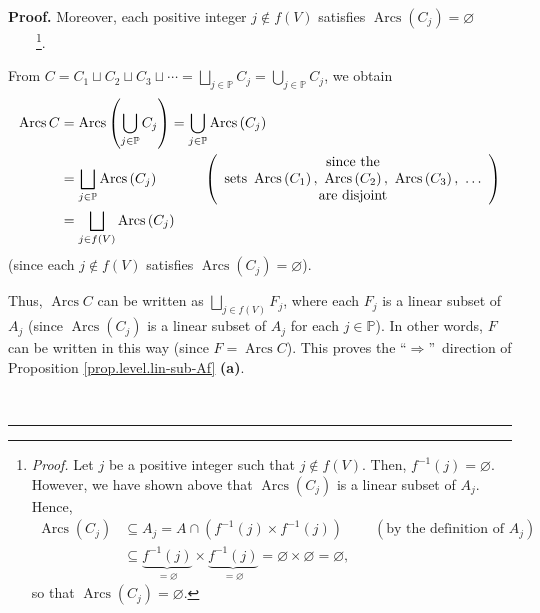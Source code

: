 \documentclass[numbers=enddot,12pt,final,onecolumn,notitlepage]{scrartcl}%
\numberwithin{exer}{section}
\theoremstyle{definition}
\newenvironment{proof}[1][Proof]{\noindent\textbf{#1.} }{\ \rule{0.5em}{0.5em}}
\let\cupnonlimits\bigcup
\let\sqcupnonlimits\bigsqcup
\renewcommand{\bigcup}{\cupnonlimits\limits}
\renewcommand{\bigsqcup}{\sqcupnonlimits\limits}
\newenvironment{verlong}{}{}
\begin{document}
\begin{verlong}
\begin{proof}
Moreover, each positive integer $j\notin f\left(  V\right)  $ satisfies
$\operatorname*{Arcs}\left(  C_{j}\right)  =\varnothing$%
\ \ \ \ \footnote{\textit{Proof.} Let $j$ be a positive integer such that
$j\notin f\left(  V\right)  $. Then, $f^{-1}\left(  j\right)  =\varnothing$.
However, we have shown above that $\operatorname*{Arcs}\left(  C_{j}\right)  $
is a linear subset of $A_{j}$. Hence,%
\begin{align*}
\operatorname*{Arcs}\left(  C_{j}\right)   &  \subseteq A_{j}=A\cap\left(
f^{-1}\left(  j\right)  \times f^{-1}\left(  j\right)  \right)
\ \ \ \ \ \ \ \ \ \ \left(  \text{by the definition of }A_{j}\right) \\
&  \subseteq\underbrace{f^{-1}\left(  j\right)  }_{=\varnothing}%
\times\underbrace{f^{-1}\left(  j\right)  }_{=\varnothing}=\varnothing
\times\varnothing=\varnothing,
\end{align*}
so that $\operatorname*{Arcs}\left(  C_{j}\right)  =\varnothing$.}.

From $C=C_{1}\sqcup C_{2}\sqcup C_{3}\sqcup\cdots=\bigsqcup_{j\in\mathbb{P}%
}C_{j}=\bigcup_{j\in\mathbb{P}}C_{j}$, we obtain%
\begin{align}
\operatorname*{Arcs}C  &  =\operatorname*{Arcs}\left(  \bigcup_{j\in
\mathbb{P}}C_{j}\right)  =\bigcup_{j\in\mathbb{P}}\operatorname*{Arcs}\left(
C_{j}\right) \nonumber\\
&  =\bigsqcup_{j\in\mathbb{P}}\operatorname*{Arcs}\left(  C_{j}\right)
\ \ \ \ \ \ \ \ \ \ \left(
\begin{array}
[c]{c}%
\text{since the}\\
\text{sets }\operatorname*{Arcs}\left(  C_{1}\right)  ,\ \operatorname*{Arcs}%
\left(  C_{2}\right)  ,\ \operatorname*{Arcs}\left(  C_{3}\right)  ,\ \ldots\\
\text{are disjoint}%
\end{array}
\right) \nonumber\\
&  =\bigsqcup_{j\in f\left(  V\right)  }\operatorname*{Arcs}\left(
C_{j}\right)  \label{pf.prop.level.lin-sub-Af.5}%
\end{align}
(since each $j\notin f\left(  V\right)  $ satisfies $\operatorname*{Arcs}%
\left(  C_{j}\right)  =\varnothing$).

Thus, $\operatorname*{Arcs}C$ can be written as $\bigsqcup_{j\in f\left(
V\right)  }F_{j}$, where each $F_{j}$ is a linear subset of $A_{j}$ (since
$\operatorname*{Arcs}\left(  C_{j}\right)  $ is a linear subset of $A_{j}$ for
each $j\in\mathbb{P}$). In other words, $F$ can be written in this way (since
$F=\operatorname*{Arcs}C$). This proves the \textquotedblleft$\Longrightarrow
$\textquotedblright\ direction of Proposition \ref{prop.level.lin-sub-Af}
\textbf{(a)}.


\end{proof}
\end{verlong}
\end{document}

